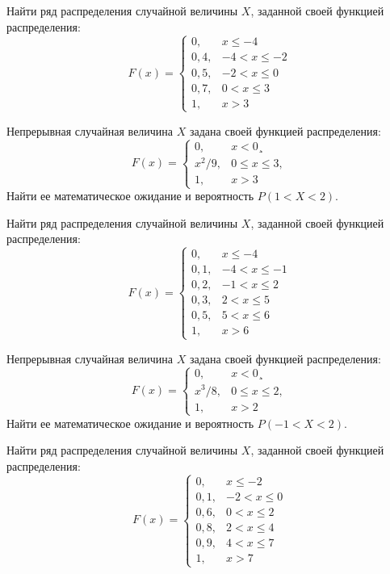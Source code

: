 \vfill

\newpage\setcounter{zad}{0}

\z Найти ряд распределения случайной величины $X$, заданной своей функцией распределения: $$ F(x) = \begin{cases}0, & x \leqslant -4 \\ 0{,}4, & -4 < x \leqslant -2 \\ 0{,}5, & -2 < x \leqslant 0 \\ 0{,}7, & 0 < x \leqslant 3 \\ 1, & x > 3 \end{cases} $$


\vfill

\z Непрерывная случайная величина $X$ задана своей функцией распределения: $$ F(x) = \begin{cases}0, & x < 0¸\\ x^2/9, & 0 \leqslant x \leqslant 3, \\ 1, & x > 3 \end{cases} $$ Найти ее математическое ожидание и вероятность $P(1 < X < 2)$.
 

\vfill

\newpage\setcounter{zad}{0}

\z Найти ряд распределения случайной величины $X$, заданной своей функцией распределения: $$ F(x) = \begin{cases}0, & x \leqslant -4 \\ 0{,}1, & -4 < x \leqslant -1 \\ 0{,}2, & -1 < x \leqslant 2 \\ 0{,}3, & 2 < x \leqslant 5 \\ 0{,}5, & 5 < x \leqslant 6 \\ 1, & x > 6 \end{cases} $$


\vfill

\z Непрерывная случайная величина $X$ задана своей функцией распределения: $$ F(x) = \begin{cases}0, & x < 0¸\\ x^3/8, & 0 \leqslant x \leqslant 2, \\ 1, & x > 2 \end{cases} $$ Найти ее математическое ожидание и вероятность $P(-1 < X < 2)$.
 

\vfill

\newpage\setcounter{zad}{0}

\z Найти ряд распределения случайной величины $X$, заданной своей функцией распределения: $$ F(x) = \begin{cases}0, & x \leqslant -2 \\ 0{,}1, & -2 < x \leqslant 0 \\ 0{,}6, & 0 < x \leqslant 2 \\ 0{,}8, & 2 < x \leqslant 4 \\ 0{,}9, & 4 < x \leqslant 7 \\ 1, & x > 7 \end{cases} $$


